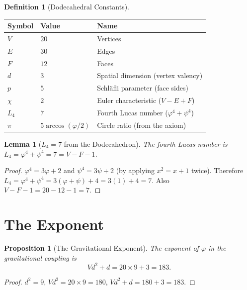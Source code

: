\documentclass[11pt,a4paper]{article}
\theoremstyle{plain}
\newtheorem{lemma}[theorem]{Lemma}
\newtheorem{proposition}[theorem]{Proposition}
\theoremstyle{definition}
\newtheorem{definition}[theorem]{Definition}
\newcommand{\vp}{\varphi}
\begin{document}
\begin{definition}[Dodecahedral Constants]\label{def:dodec}
\begin{center}
\begin{tabular}{@{}lll@{}}
\toprule
Symbol & Value & Name \\
\midrule
$V$ & $20$ & Vertices \\
$E$ & $30$ & Edges \\
$F$ & $12$ & Faces \\
$d$ & $3$ & Spatial dimension (vertex valency) \\
$p$ & $5$ & Schl\"afli parameter (face sides) \\
$\chi$ & $2$ & Euler characteristic ($V - E + F$) \\
$L_4$ & $7$ & Fourth Lucas number ($\vp^4 + \psi^4$) \\
$\pi$ & $5\arccos(\vp/2)$ & Circle ratio (from the axiom) \\
\bottomrule
\end{tabular}
\end{center}
\end{definition}

\begin{lemma}[$L_4 = 7$ from the Dodecahedron]\label{lem:L4}
The fourth Lucas number is $L_4 = \vp^4 + \psi^4 = 7 = V - F - 1$.
\end{lemma}

\begin{proof}
$\vp^4 = 3\vp + 2$ and $\psi^4 = 3\psi + 2$ (by applying $x^2 = x+1$
twice).  Therefore $L_4 = \vp^4 + \psi^4 = 3(\vp+\psi) + 4 = 3(1) + 4 = 7$.
Also $V - F - 1 = 20 - 12 - 1 = 7$.
\end{proof}

\section{The Exponent}\label{sec:exponent}

\begin{proposition}[The Gravitational Exponent]\label{prop:exponent}
The exponent of $\vp$ in the gravitational coupling is
\[
  Vd^2 + d = 20 \times 9 + 3 = 183.
\]
\end{proposition}

\begin{proof}
$d^2 = 9$, $Vd^2 = 20 \times 9 = 180$, $Vd^2 + d = 180 + 3 = 183$.
\end{proof}
\end{document}
